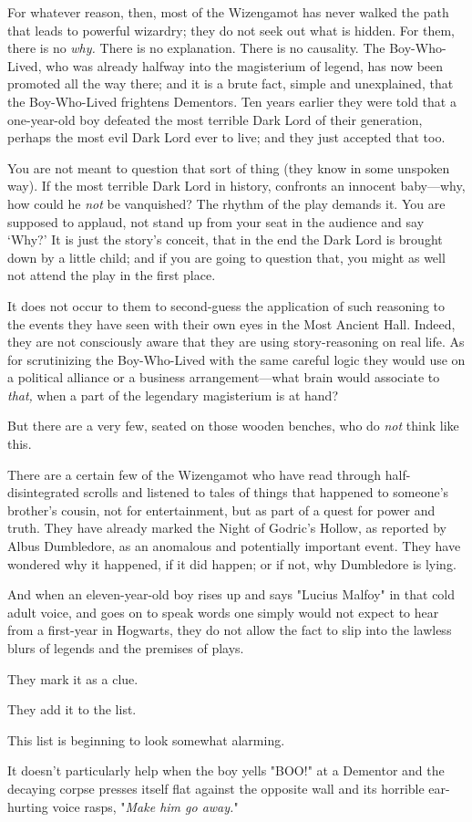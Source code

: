 For whatever reason, then, most of the Wizengamot has never walked the path 
that leads to powerful wizardry; they do not seek out what is hidden. For them, 
there is no \emph{why.} There is no explanation. There is no causality. The 
Boy-Who-Lived, who was already halfway into the magisterium of legend, has now 
been promoted all the way there; and it is a brute fact, simple and 
unexplained, that the Boy-Who-Lived frightens Dementors. Ten years earlier they 
were told that a one-year-old boy defeated the most terrible Dark Lord of their 
generation, perhaps the most evil Dark Lord ever to live; and they just 
accepted that too.

You are not meant to question that sort of thing (they know in some unspoken 
way). If the most terrible Dark Lord in history, confronts an innocent 
baby---why, how could he \emph{not} be vanquished? The rhythm of the play 
demands it. You are supposed to applaud, not stand up from your seat in the 
audience and say `Why?' It is just the story's conceit, that in the end the 
Dark Lord is brought down by a little child; and if you are going to question 
that, you might as well not attend the play in the first place.

It does not occur to them to second-guess the application of such reasoning to 
the events they have seen with their own eyes in the Most Ancient Hall. Indeed, 
they are not consciously aware that they are using story-reasoning on real 
life. As for scrutinizing the Boy-Who-Lived with the same careful logic they 
would use on a political alliance or a business arrangement---what brain would 
associate to \emph{that,} when a part of the legendary magisterium is at hand?

But there are a very few, seated on those wooden benches, who do \emph{not} 
think like this.

There are a certain few of the Wizengamot who have read through 
half-disintegrated scrolls and listened to tales of things that happened to 
someone's brother's cousin, not for entertainment, but as part of a quest for 
power and truth. They have already marked the Night of Godric's Hollow, as 
reported by Albus Dumbledore, as an anomalous and potentially important event. 
They have wondered why it happened, if it did happen; or if not, why Dumbledore 
is lying.

And when an eleven-year-old boy rises up and says "Lucius Malfoy" in that cold 
adult voice, and goes on to speak words one simply would not expect to hear 
from a first-year in Hogwarts, they do not allow the fact to slip into the 
lawless blurs of legends and the premises of plays.

They mark it as a clue.

They add it to the list.

This list is beginning to look somewhat alarming.

It doesn't particularly help when the boy yells "BOO!" at a Dementor and the 
decaying corpse presses itself flat against the opposite wall and its horrible 
ear-hurting voice rasps, "\emph{Make him go away.}"
